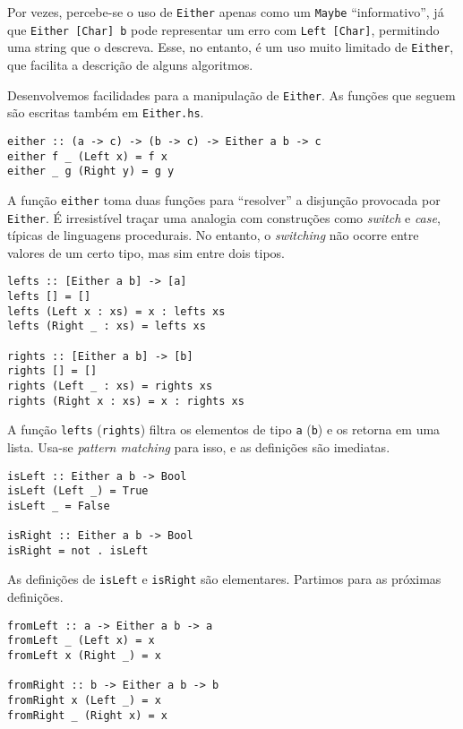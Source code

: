 \documentclass[a4paper]{article}
\begin{document}
Por vezes, percebe-se o uso de \texttt{Either} apenas como um \texttt{Maybe} ``informativo'', já que \mbox{\texttt{Either [Char] b}} pode representar um erro com \texttt{Left [Char]}, permitindo uma string que o descreva.
Esse, no entanto, é um uso muito limitado de \texttt{Either}, que facilita a descrição de alguns algoritmos.

Desenvolvemos facilidades para a manipulação de \texttt{Either}.
As funções que seguem são escritas também em \texttt{Either.hs}.

\begin{verbatim}
either :: (a -> c) -> (b -> c) -> Either a b -> c
either f _ (Left x) = f x
either _ g (Right y) = g y
\end{verbatim}

A função \texttt{either} toma duas funções para ``resolver'' a disjunção provocada por \texttt{Either}.
É irresistível traçar uma analogia com construções como \emph{switch} e \emph{case}, típicas de linguagens procedurais.
No entanto, o \emph{switching} não ocorre entre valores de um certo tipo, mas sim entre dois tipos.

\begin{verbatim}
lefts :: [Either a b] -> [a]
lefts [] = []
lefts (Left x : xs) = x : lefts xs
lefts (Right _ : xs) = lefts xs

rights :: [Either a b] -> [b]
rights [] = []
rights (Left _ : xs) = rights xs
rights (Right x : xs) = x : rights xs
\end{verbatim}

A função \texttt{lefts} (\texttt{rights}) filtra os elementos de tipo \texttt{a} (\texttt{b}) e os retorna em uma lista.
Usa-se \emph{pattern matching} para isso, e as definições são imediatas.

\pagebreak

\begin{verbatim}
isLeft :: Either a b -> Bool
isLeft (Left _) = True
isLeft _ = False

isRight :: Either a b -> Bool
isRight = not . isLeft
\end{verbatim}

As definições de \texttt{isLeft} e \texttt{isRight} são elementares.
Partimos para as próximas definições.

\begin{verbatim}
fromLeft :: a -> Either a b -> a
fromLeft _ (Left x) = x
fromLeft x (Right _) = x

fromRight :: b -> Either a b -> b
fromRight x (Left _) = x
fromRight _ (Right x) = x
\end{verbatim}
\end{document}
